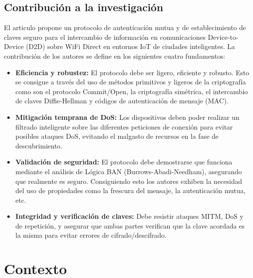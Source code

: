 \documentclass[conference,a4paper,onecolumn,11pt]{IEEEtran} %
\begin{document}
\subsection{Contribución a la investigación}
El articulo propone un protocolo de autenticación mutua y de establecimiento de claves seguro para el intercambio de información en comunicaciones Device-to-Device (D2D) sobre WiFi Direct en entornos IoT de ciudades inteligentes. La contribución de los autores se define en los siguientes cuatro fundamentos:
\begin{itemize}
    \item \textbf{Eficiencia y robustez:} El protocolo debe ser ligero, eficiente y robusto. Esto se consigue a través del uso de métodos primitivos y ligeros de la criptografía como son el protocolo Commit/Open, la criptografía simétrica, el intercambio de claves Diffie-Hellman y códigos de autenticación de mensaje (MAC).
    
    \item \textbf{Mitigación temprana de DoS:} Los dispositivos deben poder realizar un filtrado inteligente sobre las diferentes peticiones de conexión para evitar posibles ataques DoS, evitando el malgasto de recursos en la fase de descubrimiento.

    \item \textbf{Validación de seguridad:} El protocolo debe demostrarse que funciona mediante el análisis de Lógica BAN (Burrows-Abadi-Needham), asegurando que realmente es seguro. Consiguiendo esto los autores exhiben la necesidad del uso de propiedades como la frescura del mensaje, la autenticación mutua, etc.
    
    \item \textbf{Integridad y verificación de claves:} Debe resistir ataques MITM, DoS y de repetición, y asegurar que ambas partes verifican que la clave acordada es la misma para evitar errores de cifrado/descifrado.
\end{itemize}

\section{Contexto}
\end{document}
